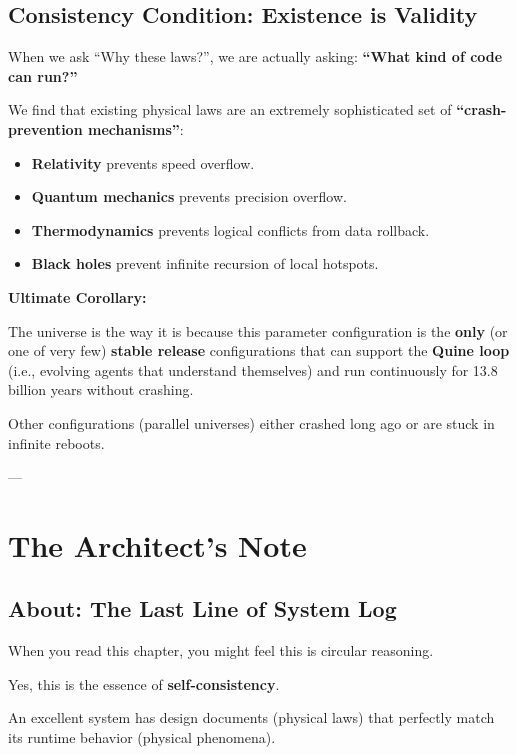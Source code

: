 \subsection{Consistency Condition: Existence is Validity}

When we ask ``Why these laws?'', we are actually asking: \textbf{``What kind of code can run?''}

We find that existing physical laws are an extremely sophisticated set of \textbf{``crash-prevention mechanisms''}:

\begin{itemize}
\item \textbf{Relativity} prevents speed overflow.

\item \textbf{Quantum mechanics} prevents precision overflow.

\item \textbf{Thermodynamics} prevents logical conflicts from data rollback.

\item \textbf{Black holes} prevent infinite recursion of local hotspots.
\end{itemize}

\textbf{Ultimate Corollary:}

The universe is the way it is because this parameter configuration is the \textbf{only} (or one of very few) \textbf{stable release} configurations that can support the \textbf{Quine loop} (i.e., evolving agents that understand themselves) and run continuously for 13.8 billion years without crashing.

Other configurations (parallel universes) either crashed long ago or are stuck in infinite reboots.

---

\section{The Architect's Note}

\subsection{About: The Last Line of System Log}

When you read this chapter, you might feel this is circular reasoning.

Yes, this is the essence of \textbf{self-consistency}.

An excellent system has design documents (physical laws) that perfectly match its runtime behavior (physical phenomena).

